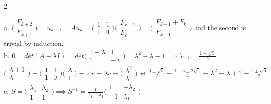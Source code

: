 \begin{paracol}{2}
\begin{mysolution}
  a. $\bigl(\begin{smallmatrix} F_{k+2} \\ F_{k+1} \end{smallmatrix}\bigr) = u_{k+1} = A u_k = \bigl(\begin{smallmatrix}1&1\\1&0\end{smallmatrix}\bigr) \bigl(\begin{smallmatrix} F_{k+1} \\ F_{k} \end{smallmatrix}\bigr) = \bigl(\begin{smallmatrix} F_{k+1} + F_{k} \\ F_{k+1} \end{smallmatrix}\bigr)$ and the second is trivial by induction. \\

  b. $0=det(A-\lambda I) = det\bigl(\begin{smallmatrix}1-\lambda&1\\1&-\lambda\end{smallmatrix}\bigr) = \lambda^2-\lambda-1 \implies \lambda_{1,2} = \frac{1 \pm \sqrt{5}}{2}$ \\ 
  
  $ \bigl(\begin{smallmatrix} \lambda + 1 \\ \lambda \end{smallmatrix}\bigr) = \bigl(\begin{smallmatrix}1&1\\1&0\end{smallmatrix}\bigr) \bigl(\begin{smallmatrix} \lambda \\ 1 \end{smallmatrix}\bigr) = A v = \lambda v = \bigl(\begin{smallmatrix} \lambda^2 \\ \lambda \end{smallmatrix}\bigr) \iff \frac{3 \pm \sqrt{5}}{2} = \frac{1+5 \pm 2\sqrt{5}}{4} = \lambda^2 = \lambda + 1 = \frac{3 \pm \sqrt{5}}{2}$ \\

  c. $S = \bigl(\begin{smallmatrix} \lambda_1 & \lambda_2 \\ 1 & 1 \end{smallmatrix}\bigr) \implies S^{-1} = \frac{1}{\lambda_1 - \lambda_2} \bigl(\begin{smallmatrix} 1 & -\lambda_2 \\ -1 & \lambda_1 \end{smallmatrix}\bigr)$ \\ 
  

\end{mysolution}
\end{paracol}
